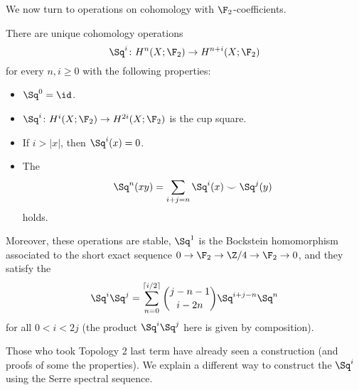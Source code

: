 We now turn to operations on cohomology with $\F_2$-coefficients.
\begin{theorem}[Steenrod]
	There are unique cohomology operations
	\begin{equation*}
		\Sq^i\colon H^n(X; \F_2) \to H^{n + i}(X; \F_2)
	\end{equation*}
	for every $n, i \geq 0$ with the following properties:
	\begin{itemize}
		\item $\Sq^0 = \id$.
		\item $\Sq^i\colon H^i(X; \F_2) \to H^{2i}(X; \F_2)$ is the cup square.
		\item If $i > |x|$, then $\Sq^i(x) = 0$.
		\item The 
			\begin{equation*}
				\Sq^n(x y) = \sum_{i + j = n} \Sq^i(x) \smile \Sq^j(y)
			\end{equation*}
			holds.
	\end{itemize}
	Moreover, these operations are stable, $\Sq^1$ is the Bockstein homomorphism associated to the short exact sequence $0 \to \F_2 \to \Zn{4} \to \F_2 \to 0$, and they satisfy the 
	\begin{equation*}
		\Sq^i \Sq^j = \sum_{n = 0}^{\lceil i / 2\rceil} \binom{j - n - 1}{i - 2n} \Sq^{i + j - n} \Sq^n
	\end{equation*}
	for all $0 < i < 2j$ (the product $\Sq^i \Sq^j$ here is given by composition).
\end{theorem}
Those who took Topology 2 last term have already seen a construction (and proofs of some the properties).
We explain a different way to construct the $\Sq^i$ using the Serre spectral sequence.

